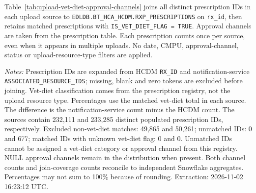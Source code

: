 \label{subsec:upload-vet-diet-approval-channels}
Table~\ref{tab:upload-vet-diet-approval-channels} joins all distinct prescription IDs in each upload source to \texttt{EDLDB.BT\_HCA\_HCDM.RXP\_PRESCRIPTIONS} on \texttt{rx\_id}, then retains matched prescriptions with \texttt{IS\_VET\_DIET\_FLAG = TRUE}. Approval channels are taken from the prescription table. Each prescription counts once per source, even when it appears in multiple uploads. No date, CMPU, approval-channel, status or upload-resource-type filters are applied.

\noindent\textit{Notes:} Prescription IDs are expanded from HCDM \texttt{RX\_ID} and notification-service \texttt{ASSOCIATED\_RESOURCE\_IDS}; missing, blank and zero tokens are excluded before joining. Vet-diet classification comes from the prescription registry, not the upload resource type. Percentages use the matched vet-diet total in each source. The difference is the notification-service count minus the HCDM count. The sources contain 232,111 and 233,285 distinct populated prescription IDs, respectively. Excluded non-vet-diet matches: 49,865 and 50,261; unmatched IDs: 0 and 677; matched IDs with unknown vet-diet flag: 0 and 0. Unmatched IDs cannot be assigned a vet-diet category or approval channel from this registry. NULL approval channels remain in the distribution when present. Both channel counts and join-coverage counts reconcile to independent Snowflake aggregates. Percentages may not sum to 100\% because of rounding. Extraction: 2026-11-02 16:23:12 UTC.



\clearpage
